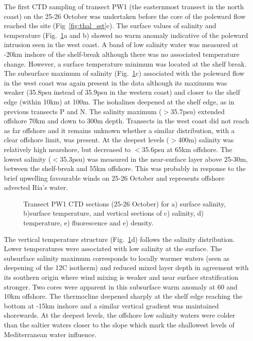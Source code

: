 The first CTD sampling of transect PW1 (the easternmost transect
in the north coast) on the 25-26 October was undertaken before the
core of the poleward flow reached the site
(Fig~\ref{fig:thal_sst}c). The surface values of salinity and
temperature (Fig.~\ref{fig:thalCTD_PW1}a and b) showed no warm
anomaly indicative of the poleward intrusion seen in the west
coast. A band of low salinity water was measured at -20km inshore
of the shelf-break although there was no associated temperature
change. However, a surface temperature minimum was located at the
shelf break. The subsurface maximum of salinity
(Fig.~\ref{fig:thalCTD_PW1}c) associated with the poleward flow in
the west coast was again present in the data although its maximum
was weaker (35.8psu instead of 35.9psu in the western coast) and
closer to the shelf edge (within 10km) at 100m. The isohalines
deepened at the shelf edge, as in previous transects P and N. The
salinity maximum ($>$35.7psu) extended offshore 70km and down to
300m depth. Transects in the west coast did not reach as far
offshore and it remains unknown whether a similar distribution,
with a clear offshore limit, was present. At the deepest levels
($>$400m) salinity was relatively high nearshore, but decreased to
$<$35.6psu at 65km offshore. The lowest salinity ($<$35.3psu) was
measured in the near-surface layer above 25-30m, between the
shelf-break and 55km offshore. This was probably in response to
the brief upwelling favourable winds on 25-26 October and
represents offshore advected Ria's water.
\begin{figure}[t]
\begin{widefig}{-.5cm}{-.7cm}
\arribacap \centering \hspace{0.4cm}
\hspace{0.4cm}
\quad%
\subfigure[]{\texttt{[image: GC1\_S]}}%
\subfigure[]{\texttt{[image: GC1\_T]}}\quad%
\subfigure[]{\texttt{[image: GC1\_F]}}%
\subfigure[]{\texttt{[image: GC1\_D]}}%
\caption{Transect PW1 CTD sections (25-26 October)  for a) surface
salinity, b)surface temperature, and vertical sections of c)
salinity, d) temperature, e) fluorescence and e) density.}
\label{fig:thalCTD_PW1}
\end{widefig}\end{figure}

The vertical temperature structure (Fig.~\ref{fig:thalCTD_PW1}d)
follows the salinity distribution. Lower temperatures were
associated with low salinity at the surface. The subsurface
salinity maximum corresponds to locally warmer waters (seen as
deepening of the 12\deg C isotherm) and reduced mixed layer depth
in agreement with its southern origin where wind mixing is weaker
and near surface stratification stronger. Two cores were apparent
in this subsurface warm anomaly at 60 and 10km offshore. The
thermocline deepened sharply at the shelf edge reaching the bottom
at -15km inshore and a similar vertical gradient was maintained
shorewards. At the deepest levels, the offshore low salinity
waters were colder than the saltier waters closer to the slope
which mark the shallowest levels of Mediterranean water influence.

